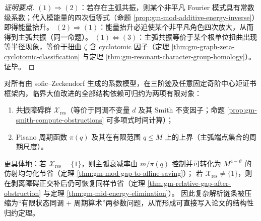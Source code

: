 \begin{proof}[证明要点]
\((1)\Rightarrow(2)\)：若存在主弧共振，则某个非平凡 Fourier 模式具有常数级系数；代入模能量的四次恒等式（命题 \ref{prop:gm-mod-additive-energy-inverse}）即得能量抬升。
\((2)\Rightarrow(1)\)：能量抬升必迫使某个非平凡角色四次放大，从而得到主弧共振（同一命题）。
\((1)\Leftrightarrow(3)\)：主弧共振等价于某个根单位扭曲出现等半径现象，等价于扭曲 \(\zeta\) 含 cyclotomic 因子（定理 \ref{thm:gm-graph-zeta-cyclotomic-classification} 与定理 \ref{thm:gm-resonant-character-group-homology}）。证毕。
\end{proof}

\begin{theorem}\label{thm:gm-two-finite-objects-outline}
对所有由 sofic--Zeckendorf 生成的系数模型，在三阶迹及任意固定奇阶中心矩证书框架内，临界大值改进的全部结构依赖可归约为两项有限对象：
\begin{enumerate}
  \item 共振障碍群 \(\mathcal{X}_{\mathrm{res}}\)（等价于同调不变量 \(d\) 及其 Smith 不变因子；命题 \ref{prop:gm-smith-compute-obstructions} 可多项式时间计算）；
  \item Pisano 周期函数 \(\pi(q)\) 及其在有限范围 \(q\le M\) 上的上界（主弧端点集合的周期尺度）。
\end{enumerate}
更具体地：若 \(\mathcal{X}_{\mathrm{res}}=\{1\}\)，则主弧衰减率由 \(m/\pi(q)\) 控制并可转化为 \(M^{4-\vartheta}\) 的仿射均匀化节省（定理 \ref{thm:gm-mod-gap-to-affine-saving}）；
若 \(\mathcal{X}_{\mathrm{res}}\neq\{1\}\)，则在剥离障碍正交补后仍可恢复同样节省（定理 \ref{thm:gm-relative-gap-after-obstruction} 与定理 \ref{thm:gm-mid-energy-elimination}）。
因此复杂解析链条被压缩为“有限状态同调 \(+\) 周期算术”两参数问题，从而形成可直接写入论文的结构性归约定理。
\end{theorem}

\endinput
